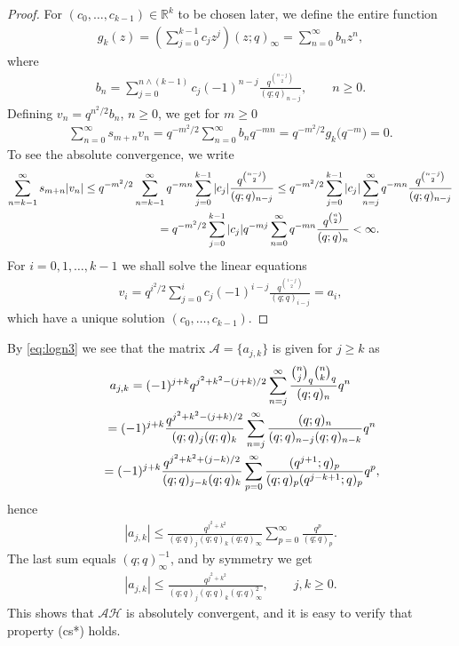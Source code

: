 \documentclass[pdftex]{sigma}
\newcommand{\R}{\mathbb{R}}
\numberwithin{equation}{section}
\begin{document}
\begin{proof}
For $(c_0,\ldots, c_{k-1})\in\R^k$ to be chosen later, we define the entire function
\begin{gather*}
g_k(z)=\left(\sum_{j=0}^{k-1} c_jz^j\right) (z;q)_\infty=\sum_{n=0}^\infty b_nz^n,
\end{gather*}
where
\begin{gather*}
b_n=\sum_{j=0}^{n\wedge (k-1)} c_j(-1)^{n-j}\frac{q^{\binom{n-j}{2}}}{(q;q)_{n-j}},\qquad n\ge 0.
\end{gather*}
Defining $v_n=q^{n^2/2}b_n$, $n\ge 0$, we get for $m\ge 0$
\begin{gather*}
\sum_{n=0}^\infty s_{m+n}v_n=q^{-m^2/2}\sum_{n=0}^\infty b_n q^{-mn}=q^{-m^2/2}g_k\big(q^{-m}\big)=0.
\end{gather*}
To see the absolute convergence, we write
\begin{gather*}
 \sum_{n=k-1}^\infty s_{m+n}|v_n| \le q^{-m^2/2}\sum_{n=k-1}^\infty q^{-mn}\sum_{j=0}^{k-1}|c_j|\frac{q^{\binom{n-j}{2}}}{(q;q)_{n-j}}
 \le q^{-m^2/2}\sum_{j=0}^{k-1}|c_j| \sum_{n=j}^\infty q^{-mn}\frac{q^{\binom{n-j}{2}}}{(q;q)_{n-j}}\\
\hphantom{\sum_{n=k-1}^\infty s_{m+n}|v_n| }{} = q^{-m^2/2}\sum_{j=0}^{k-1}|c_j| q^{-mj}\sum_{n=0}^\infty q^{-mn}\frac{q^{\binom{n}{2}}}{(q;q)_{n}}<\infty.
\end{gather*}
For $i=0,1,\ldots,k-1$ we shall solve the linear equations
\begin{gather*}
v_i=q^{i^2/2}\sum_{j=0}^{i} c_j (-1)^{i-j}\frac{q^{\binom{i-j}{2}}}{(q;q)_{i-j}}=a_i,
\end{gather*}
which have a unique solution $(c_0,\ldots,c_{k-1})$.
\end{proof}

By \eqref{eq:logn3} we see that the matrix $\mathcal A=\{a_{j,k}\}$ is given for $j\ge k$ as
\begin{gather*}
a_{j,k} = (-1)^{j+k}q^{j^2+k^2-(j+k)/2}\sum_{n=j}^\infty \frac{\binom{n}{j}_q\binom{n}{k}_q}{(q;q)_n}q^{n}\\
\hphantom{a_{j,k}}{} = (-1)^{j+k}\frac{q^{j^2+k^2-(j+k)/2}}{(q;q)_j(q;q)_k}\sum_{n=j}^\infty \frac{(q;q)_n}{(q;q)_{n-j}(q;q)_{n-k}} q^n\\
\hphantom{a_{j,k}}{} = (-1)^{j+k}\frac{q^{j^2+k^2+(j-k)/2}}{(q;q)_{j-k}(q;q)_k}\sum_{p=0}^\infty
\frac{(q^{j+1};q)_p}{(q;q)_p (q^{j-k+1};q)_p}q^p,
\end{gather*}
hence
\begin{gather*}
|a_{j,k}|\le \frac{q^{j^2+k^2}}{(q;q)_j(q;q)_k(q;q)_\infty}\sum_{p=0}^\infty \frac{q^p}{(q;q)_p}.
\end{gather*}
The last sum equals $(q;q)_\infty^{-1}$, and by symmetry we get{\samepage
\begin{gather*}
|a_{j,k}|\le \frac{q^{j^2+k^2}}{(q;q)_j(q;q)_k(q;q)_\infty^2},\qquad j,k\ge 0.
\end{gather*}
 This shows that $\mathcal A\mathcal H$ is absolutely convergent, and it is easy to verify that property (cs*) holds.}
\end{document}
